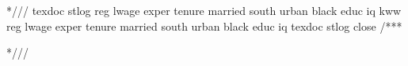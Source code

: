 
*///
texdoc stlog
reg lwage exper tenure married south urban black educ iq kww
reg lwage exper tenure married south urban black educ iq
texdoc stlog close
/***

*///
